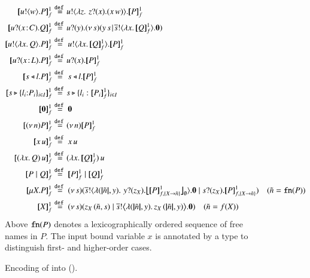 \begin{figure}[t!]
\begin{align*}
	\pmapp{\bout{u}{w} P}{1}{f}	&\defeq	\!\bout{u}{ \abs{z}{\,\binp{z}{x} (\appl{x}{w})} } \pmapp{P}{1}{f}
	\\
	\pmapp{\binp{u}{\AT{x}{C}} Q}{1}{f}	&\defeq	\!\binp{u}{y} \newsp{s}{\appl{y}{s} \!\Par\! \bout{\dual{s}}{\abs{x}{\pmapp{Q}{1}{f}}} \inact}
		\\
	\pmapp{\bout{u}{\abs{{x}}{Q}} P}{1}{f}  &\defeq \bout{u}{\abs{{x}}{\pmapp{Q}{1}{f}}} \pmapp{P}{1}{f}
	\\
	\pmapp{\binp{u}{\AT{x}{L}} P}{1}{f} &\defeq \!\binp{u}{x} \pmapp{P}{1}{f}
	\\
	\pmapp{\bsel{s}{l} P}{1}{f} &\defeq \bsel{s}{l} \pmapp{P}{1}{f}
	\\
	\pmapp{\bbra{s}{l_i{:}P_i}_{i \in I}}{1}{f} &\defeq \!\bbra{s}{l_i: \pmapp{P_i}{1}{f}}_{i \in I}
	\\
	\pmapp{\inact}{1}{f} &\defeq \inact
	\\
	\pmapp{\news{n} P}{1}{f} &\defeq \!\news{n} \pmapp{P}{1}{f}
	\\
	\pmapp{{x}\, {u}}{1}{f} &\defeq \appl{x}{u}
	\\
	\pmapp{\appl{(\abs{x}{Q})}{u}}{1}{f} &\defeq \!\appl{(\abs{x}{\pmapp{Q}{1}{f}})}{u}
	\\	
	\pmapp{P \Par Q}{1}{f} & \defeq \pmapp{P}{1}{f} \Par \pmapp{Q}{1}{f}
	\\
	\pmapp{\recp{X}{P}}{1}{f} &\defeq
		\newsp{s}{\bout{\dual{s}}{\abs{(\vmap{\tilde{n}}, y)} \,{\binp{y}{z_\X} \auxmapp{\pmapp{P}{1}{{f,\{\rvar{X}\to \tilde{n}\}}}}{{}}{\es}}} \inact \Par  \binp{s}{z_\X} \pmapp{P}{1}{{f,\{\rvar{X}\to \tilde{n}\}}}}
	\quad
	(\tilde{n} = \fn{P})
	\\ 
	\pmapp{\rvar{X}}{1}{f} & \defeq 
		\newsp{s}{\appl{z_X}{(\tilde{n}, s)} \Par \bbout{\dual{s}}{ \abs{(\vmap{\tilde{n}},y)}{\appl{z_X}{(\vmap{\tilde{n}}, y)}}} \inact}  \quad (\tilde{n} = f(\rvar{X}))
\end{align*}
%
Above $\mathtt{fn}(P)$ denotes a lexicographically ordered sequence  of free names in $P$.
The input bound variable $x$ is annotated by a type to distinguish first- and higher-order cases.
\caption{\label{f:enc:hopi_to_ho}Encoding of \HOp into \HO ().}
\end{figure}

